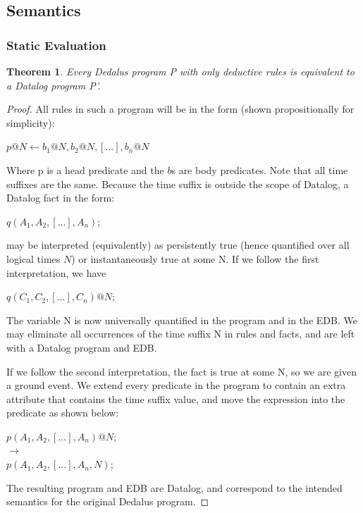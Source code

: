 \subsection{Semantics}




\subsubsection{Static Evaluation}
\newtheorem{theorem}{Theorem}

\begin{theorem}
Every Dedalus program P with only deductive rules is equivalent to a Datalog program P'.
\end{theorem}

\begin{proof}
All rules in such a program will be in the form (shown propositionally for simplicity): 

$p@N \leftarrow b_{1}@N, b_{2}@N, [...], b_{n}@N$

Where p is a head predicate and the $b$s are body predicates.  Note that all time suffixes are 
the same.  Because the time suffix is outside the scope of Datalog, a Datalog fact in the form:

$q(A_{1}, A_{2}, [...], A_{n});$

may be interpreted (equivalently) as persistently true (hence quantified over all logical times $N$) or instantaneously
true at some N.  If we follow the first interpretation, we have 

$q(C_{1}, C_{2}, [...], C_{n})@N;$

The variable N is now universally quantified in the program and in the EDB.  We may eliminate all occurrences of the time suffix N
in rules and facts, and are left with a Datalog program and EDB.

If we follow the second interpretation, the fact is true at some N, so we are given a ground event.  We extend every predicate in 
the program to contain an extra attribute that contains the time suffix value, and move the expression into the predicate as shown below:

$p(A_{1}, A_{2}, [...], A_{n})@N;$\\
$\rightarrow$\\
$p(A_{1}, A_{2}, [...], A_{n}, N);$

The resulting program and EDB are Datalog, and correspond to the intended semantics for the original Dedalus program.

\end{proof}


